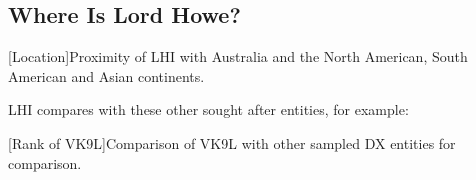 \documentclass[11pt]{article}
\begin{document}
\subsection{Where Is Lord Howe?}

\vskip2mm
\noindent%
\begin{minipage}{\linewidth}%
\captionsetup{width=0.8\linewidth}
[Location]{Proximity of LHI with Australia and the North 
American, South American and Asian continents.}
\label{prox}
\end{minipage}
\vskip3mm

\par
LHI compares with these other sought after entities, for example:
\vskip2mm

\noindent%
\begin{minipage}{\linewidth}%
\captionsetup{width=0.8\linewidth}
[Rank of VK9L]{Comparison of VK9L with other sampled DX 
entities for
comparison.}
\label{compare}
\end{minipage}
\end{document}
